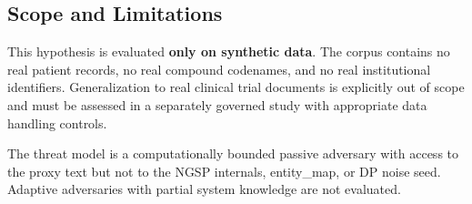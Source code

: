 \subsection{Scope and Limitations}\label{scope-and-limitations}

This hypothesis is evaluated \textbf{only on synthetic data}. The corpus
contains no real patient records, no real compound codenames, and no
real institutional identifiers. Generalization to real clinical trial
documents is explicitly out of scope and must be assessed in a
separately governed study with appropriate data handling controls.

The threat model is a computationally bounded passive adversary with
access to the proxy text but not to the NGSP internals, entity\_map, or
DP noise seed. Adaptive adversaries with partial system knowledge are
not evaluated.

